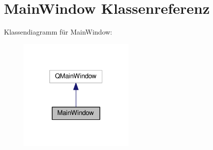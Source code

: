 \hypertarget{classMainWindow}{}\section{Main\+Window Klassenreferenz}
\label{classMainWindow}


Klassendiagramm für Main\+Window\+:
\nopagebreak
\begin{figure}[H]
\begin{center}
\leavevmode
\includegraphics[width=160pt]{classMainWindow__inherit__graph}
\end{center}
\end{figure}
